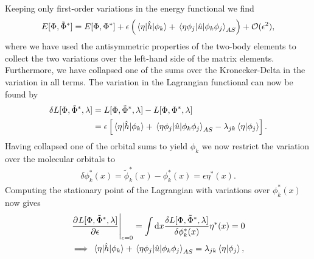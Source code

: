             Keeping only first-order variations in the energy functional we find
            \begin{align}
                E[\Phi, \tilde{\Phi}^{*}]
                = E[\Phi, \Phi^{*}]
                + \epsilon\left( 
                    \mel*{\eta}{\hat{h}}{\phi_k}
                    + \mel*{\eta\phi_j}{\hat{u}}{\phi_k\phi_j}_{AS}
                 \right)
                + \mathcal{O}(\epsilon^2),
            \end{align}
            where we have used the antisymmetric properties of the two-body
            elements to collect the two variations over the left-hand side of
            the matrix elements.
            Furthermore, we have collapsed one of the sums over the
            Kronecker-Delta in the variation in all terms.
            The variation in the Lagrangian functional can now be found by
            \begin{align}
                \delta L[\Phi, \tilde{\Phi}^{*}, \lambda]
                &=
                L[\Phi, \tilde{\Phi}^{*}, \lambda]
                -
                L[\Phi, \Phi^{*}, \lambda]
                \\
                &=
                \epsilon\left[ 
                    \mel*{\eta}{\hat{h}}{\phi_k}
                    +
                    \mel*{\eta\phi_j}{\hat{u}}{\phi_k\phi_j}_{AS}
                    - \lambda_{jk}
                    \braket*{\eta}{\phi_j}
                 \right].
            \end{align}
            Having collapsed one of the orbital sums to yield $\phi_k$ we now
            restrict the variation over the molecular orbitals to
            \begin{align}
                \delta\phi^{*}_k(x)
                = \tilde{\phi}^{*}_k(x)
                - \phi^{*}_k(x)
                = \epsilon\eta^{*}(x).
            \end{align}
            Computing the stationary point of the Lagrangian with variations
            over $\phi^{*}_k(x)$ now gives
            \begin{gather}
                \left.
                \dpd{
                    \lagrangianfunc{\slat, \tilde{\slat}^{*}, \lambda}
                }{\epsilon}
                \right\lvert_{\epsilon = 0}
                =
                \int\dd x\frac{
                    \delta\lagrangianfunc{\slat, \tilde{\slat}^{*}, \lambda}
                }{\delta \phi^{*}_k(x)}
                \eta^{*}(x)
                = 0
                \\
                \implies
                \mel*{\eta}{\onehamil}{\phi_k}
                + \mel*{\eta\phi_j}{\twohamil}{\phi_k\phi_j}_{AS}
                = \lambda_{jk}\braket*{\eta}{\phi_j},
                \label{eq:stationary-lagrangian}
            \end{gather}
